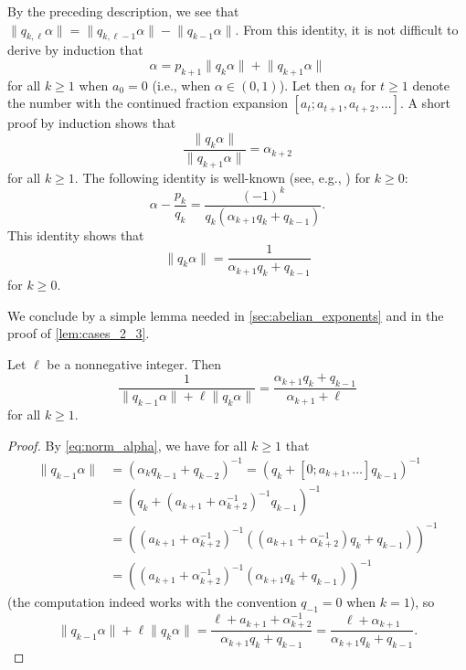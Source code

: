 \documentclass[a4paper,fleqn]{article}
\providecommand{\norm}[1]{\lVert#1\rVert}
\begin{document}
  By the preceding description, we see that
  $\norm{q_{k,\ell}\alpha} = \norm{q_{k,\ell-1}\alpha} - \norm{q_{k-1}\alpha}$. From this identity, it is not
  difficult to derive by induction that
  \begin{equation}\label{eq:cf_identity}
    \alpha = p_{k+1}\norm{q_k\alpha} + \norm{q_{k+1}\alpha}
  \end{equation}
  for all $k \geq 1$ when $a_0 = 0$ (i.e., when $\alpha \in (0, 1)$). Let then $\alpha_t$ for $t \geq 1$ denote the
  number with the continued fraction expansion $[a_t; a_{t+1}, a_{t+2}, \ldots]$. A short proof by induction shows that
  \begin{equation}\label{eq:cf_identity_2}
    \frac{\norm{q_k\alpha}}{\norm{q_{k+1}\alpha}} = \alpha_{k+2}
  \end{equation}
  for all $k \geq 1$. The following identity is well-known (see, e.g.,
  \cite[Sect.~10.7]{1979:an_introduction_to_the_theory_of_numbers}) for $k \geq 0$:
  \begin{equation*}
    \alpha - \frac{p_k}{q_k} = \frac{(-1)^k}{q_k(\alpha_{k+1}q_k + q_{k-1})}.
  \end{equation*}
  This identity shows that
  \begin{equation}\label{eq:norm_alpha}
    \norm{q_k\alpha} = \frac{1}{\alpha_{k+1}q_k + q_{k-1}}
  \end{equation}
  for $k \geq 0$.

  We conclude by a simple lemma needed in \autoref{sec:abelian_exponents} and in the proof of \autoref{lem:cases_2_3}.

  \begin{lemma}\label{lem:consecutive_norm}
    Let $\ell$ be a nonnegative integer. Then
    \begin{equation*}
      \frac{1}{\norm{q_{k-1}\alpha} + \ell\norm{q_k \alpha}} = \frac{\alpha_{k+1}q_k + q_{k-1}}{\alpha_{k+1} + \ell}
    \end{equation*}
    for all $k \geq 1$.
  \end{lemma}
  \begin{proof}
    By \eqref{eq:norm_alpha}, we have for all $k \geq 1$ that
    \begin{align*}
      \norm{q_{k-1}\alpha} &= (\alpha_k q_{k-1} + q_{k-2})^{-1} = (q_k + [0; a_{k+1}, \ldots]q_{k-1})^{-1} \\
                           &= (q_k + (a_{k+1} + \alpha_{k+2}^{-1})^{-1}q_{k-1})^{-1} \\
                           &= ( (a_{k+1} + \alpha_{k+2}^{-1})^{-1}( (a_{k+1} + \alpha_{k+2}^{-1})q_k + q_{k-1}) )^{-1} \\
                           &= ( (a_{k+1} + \alpha_{k+2}^{-1})^{-1}(\alpha_{k+1}q_k + q_{k-1}) )^{-1}
    \end{align*}
    (the computation indeed works with the convention $q_{-1} = 0$ when $k = 1$), so
    \begin{equation*}
      \norm{q_{k-1}\alpha} + \ell \norm{q_k \alpha} = \frac{\ell + a_{k+1} + \alpha_{k+2}^{-1}}{\alpha_{k+1}q_k + q_{k-1}} = \frac{\ell + \alpha_{k+1}}{\alpha_{k+1}q_k + q_{k-1}}.
    \end{equation*}
  \end{proof}
\end{document}
